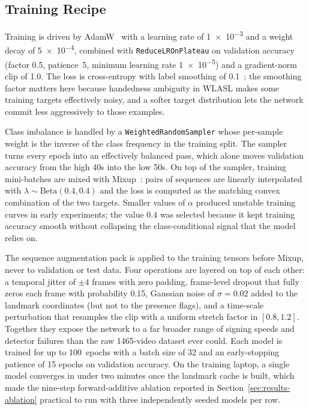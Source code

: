 \subsection{Training Recipe}
\label{sec:impl-lstm-training}

Training is driven by AdamW~\cite{loshchilov2019adamw} with a
learning rate of \num{1e-3} and a weight decay of \num{5e-4},
combined with \texttt{ReduceLROnPlateau} on validation accuracy
(factor \num{0.5}, patience~5, minimum learning rate \num{1e-5})
and a gradient-norm clip of \num{1.0}. The loss is cross-entropy
with label smoothing of \num{0.1}~\cite{szegedy2016rethinking}; the
smoothing factor matters here because handedness ambiguity in WLASL
makes some training targets effectively noisy, and a softer target
distribution lets the network commit less aggressively to those
examples.

Class imbalance is handled by a \texttt{WeightedRandomSampler} whose
per-sample weight is the inverse of the class frequency in the
training split. The sampler turns every epoch into an effectively
balanced pass, which alone moves validation accuracy from the high
40s into the low 50s. On top of the sampler, training mini-batches
are mixed with Mixup~\cite{zhang2018mixup}: pairs of sequences are
linearly interpolated with $\lambda \sim \mathrm{Beta}(0.4, 0.4)$
and the loss is computed as the matching convex combination of the
two targets. Smaller values of $\alpha$ produced unstable training
curves in early experiments; the value $0.4$ was selected because it
kept training accuracy smooth without collapsing the class-conditional
signal that the model relies on.

The sequence augmentation pack is applied to the training tensors
before Mixup, never to validation or test data. Four operations are
layered on top of each other: a temporal jitter of $\pm 4$ frames
with zero padding, frame-level dropout that fully zeros each frame
with probability \num{0.15}, Gaussian noise of $\sigma = 0.02$ added
to the landmark coordinates (but not to the presence flags), and a
time-scale perturbation that resamples the clip with a uniform
stretch factor in $[0.8, 1.2]$. Together they expose the network to
a far broader range of signing speeds and detector failures than the
raw 1465-video dataset ever could. Each model is trained for up to
100~epochs with a batch size of 32 and an early-stopping patience of
15 epochs on validation accuracy. On the training laptop, a single
model converges in under two minutes once the landmark cache is
built, which made the nine-step forward-additive ablation reported
in Section~\ref{sec:results-ablation} practical to run with three
independently seeded models per row.

